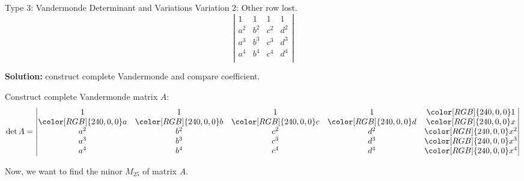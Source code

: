 \documentclass{beamer}
\begin{document}
\begin{frame}{Type 3: Vandermonde Determinant and Variations}
Variation 2: Other row lost.
\begin{equation*}
    \left| \begin{matrix}
        1&		1&		1&		1\\
        a^2&		b^2&		c^2&		d^2\\
        a^3&		b^3&		c^3&		d^3\\
        a^4&		b^4&		c^4&		d^4\\
    \end{matrix} \right|
\end{equation*}

\textbf{Solution:} construct complete Vandermonde and compare coefficient.

\vspace{3pt}
Construct complete Vandermonde matrix $A$:
\begin{equation*}
    \det A=\left| \begin{matrix}
        1&		1&		1&		1&		{\color[RGB]{240, 0, 0} 1}\\
        {\color[RGB]{240, 0, 0} a}&		{\color[RGB]{240, 0, 0} b}&		{\color[RGB]{240, 0, 0} c}&		{\color[RGB]{240, 0, 0} d}&		{\color[RGB]{240, 0, 0} x}\\
        a^2&		b^2&		c^2&		d^2&		{\color[RGB]{240, 0, 0} x^2}\\
        a^3&		b^3&		c^3&		d^3&		{\color[RGB]{240, 0, 0} x^3}\\
        a^4&		b^4&		c^4&		d^4&		{\color[RGB]{240, 0, 0} x^4}\\
    \end{matrix} \right|
\end{equation*}

Now, we want to find the minor $M_{25}$ of matrix $A$.
\end{frame}
\end{document}
